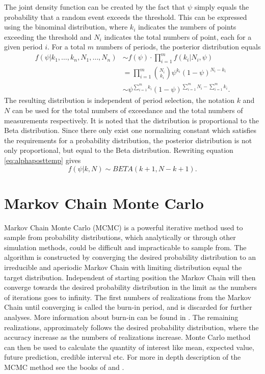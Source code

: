 The joint density function can be created by the fact that $\psi$ simply equals the probability that a random event exceeds the threshold. This can be expressed using the binominal distribution, where $k_i$ indicates the numbers of points exceeding the threshold and $N_i$ indicates the total numbers of point, each for a given period $i$. For a total $m$ numbers of periods, the posterior distribution equals
\begin{align}
f(\psi|k_1,\dotsc,k_n, N_1, \dotsc, N_n)&\sim f(\psi)\cdot \prod_{i=1}^{m} f(k_i|N_i,\psi)\nonumber\\
&=\prod_{i=1}^{m} \binom{N_i}{k_i} \psi^{k_i}(1-\psi)^{N_i-k_i}\nonumber\\
& \sim \psi^{\sum_{i=1}^{m}k_i}(1-\psi)^{\sum_{i=1}^{m}N_i-\sum_{i=1}^{m}k_i}.\label{eq:alphaposttemp}
\end{align}
The resulting distribution is independent of period selection, the notation $k$ and $N$ can be used for the total numbers of exceedance and the total numbers of measurements respectively. It is noted that the distribution is proportional to the Beta distribution. Since there only exist one normalizing constant which satisfies the requirements for a probability distribution, the posterior distribution is not only proportional, but equal to the Beta distribution. Rewriting equation \eqref{eq:alphaposttemp} gives
\begin{equation}
\label{eq:alphapost}
f(\psi|k,N) \sim BETA(k+1,N-k+1).
\end{equation}

\section{Markov Chain Monte Carlo}
\label{ch:mcmc}
Markov Chain Monte Carlo (MCMC) is a powerful iterative method used to sample from probability distributions, which analytically or through other simulation methods, could be difficult and impracticable to sample from. The algorithm is constructed by converging the desired probability distribution to an irreducible and aperiodic Markov Chain with limiting distribution equal the target distribution. Independent of starting position the Markov Chain will then converge towards the desired probability distribution in the limit as the numbers of iterations goes to infinity. The first numbers of realizations from the Markov Chain until converging is called the burn-in period, and is discarded for further analyses. More information about burn-in can be found in \cite[p.220]{compstat}. The remaining realizations, approximately follows the desired probability distribution, where the accuracy increase as the numbers of realizations increase. Monte Carlo method can then be used to calculate the quantity of interest like mean, expected value, future prediction, credible interval etc. For more in depth description of the MCMC method see the books of \cite{MCMC} and \cite[Chapter~7,8]{compstat}.

